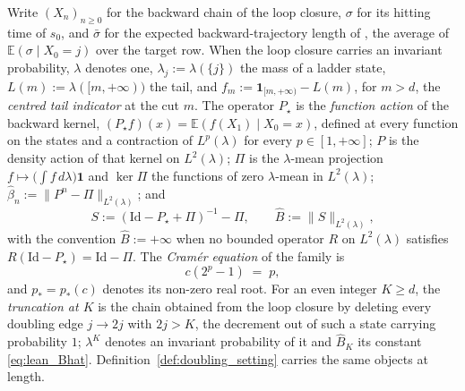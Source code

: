 \begin{definition}
Write $(X_n)_{n\geq0}$ for the backward chain of the loop closure, $\sigma$ for its hitting
time of $s_0$, and $\bar\sigma$ for the expected backward-trajectory length of
\citet{morozov2025revisiting}, the average of $\mathbb E(\sigma\mid X_0=j)$ over the target
row. When the loop closure carries an invariant probability, $\lambda$ denotes one,
$\lambda_j:=\lambda(\{j\})$ the mass of a ladder state, $L(m):=\lambda([m,+\infty))$ the tail,
and $f_m:=\mathbf 1_{[m,+\infty)}-L(m)$, for $m>d$, the \emph{centred tail indicator} at the
cut $m$. The operator $P_\star$ is the \emph{function action} of the backward kernel,
$(P_\star f)(x)=\mathbb E(f(X_1)\mid X_0=x)$, defined at every function on the states and a
contraction of $L^p(\lambda)$ for every $p\in[1,+\infty]$; $P$ is the density action of that
kernel on $L^2(\lambda)$; $\Pi$ is the $\lambda$-mean projection
$f\mapsto\bigl(\int f\,d\lambda\bigr)\mathbf 1$ and $\ker\Pi$ the functions of zero
$\lambda$-mean in $L^2(\lambda)$; $\widehat\beta_n:=\|P^n-\Pi\|_{L^2(\lambda)}$; and
\begin{equation}\label{eq:lean_Bhat}
    S:=\left(\mathrm{Id}-P_\star+\Pi\right)^{-1}-\Pi,\qquad
    \widehat B:=\|S\|_{L^2(\lambda)},
\end{equation}
with the convention $\widehat B:=+\infty$ when no bounded operator $R$ on $L^2(\lambda)$
satisfies $R(\mathrm{Id}-P_\star)=\mathrm{Id}-\Pi$. The \emph{Cram\'er equation} of the family
is
\begin{equation}\label{eq:lean_cramer}
    c\left(2^p-1\right)\;=\;p ,
\end{equation}
and $p_*=p_*(c)$ denotes its non-zero real root. For an even integer $K\geq d$, the
\emph{truncation at $K$} is the chain obtained from the loop closure by deleting every doubling
edge $j\rightarrow2j$ with $2j>K$, the decrement out of such a state carrying probability $1$;
$\lambda^K$ denotes an invariant probability of it and $\widehat B_K$ its constant
\eqref{eq:lean_Bhat}. Definition~\ref{def:doubling_setting} carries the same objects
at length.
\end{definition}

